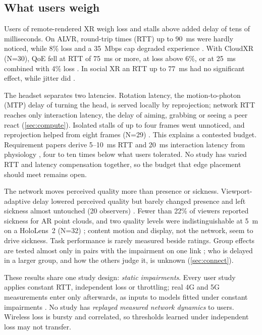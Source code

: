 \subsection{What users weigh}
Users of remote-rendered XR weigh loss and stalls above added delay of tens of milliseconds. On ALVR,
round-trip times (RTT) up to 90~ms were hardly noticed, while 8\% loss and a 35~Mbps cap degraded
experience \cite{W3095344018}. With CloudXR (N=30), QoE fell at RTT of 75~ms or more, at loss above 6\%,
or at 25~ms combined with 4\% loss \cite{W4402156718}. In social XR an RTT up to 77~ms had no significant
effect, while jitter did \cite{W4410087219}.

The headset separates two latencies. Rotation latency, the motion-to-photon (MTP) delay of turning the
head, is served locally by reprojection; network RTT reaches only interaction latency, the delay of
aiming, grabbing or seeing a peer react (\cref{sec:compute}). Isolated stalls of up to four frames went
unnoticed, and reprojection helped from eight frames (N=29) \cite{W4301184864}. This explains a contested
budget. Requirement papers derive 5--10~ms RTT and 20~ms interaction latency from physiology
\cite{W3035467795}, four to ten times below what users tolerated. No study has varied RTT and latency
compensation together, so the budget that edge placement should meet remains open.

The network moves perceived quality more than presence or sickness. Viewport-adaptive delay lowered
perceived quality but barely changed presence and left sickness almost untouched (20 observers)
\cite{W3037996690}. Fewer than 22\% of viewers reported sickness for AR point clouds, and two quality
levels were indistinguishable at 5~m on a HoloLens~2 (N=32) \cite{W4387831705}; content motion and
display, not the network, seem to drive sickness. Task performance is rarely measured beside
ratings. Group effects are tested almost only in pairs with
the impairment on one link \cite{W4415821547}; who is delayed in a larger group, and how the others judge
it, is unknown (\cref{sec:connect}).

These results share one study design: \emph{static impairments}. Every user study applies constant RTT,
independent loss or throttling; real 4G and 5G measurements enter only
afterwards, as inputs to models fitted under constant impairments \cite{W4405935991}. No study has
\emph{replayed measured network dynamics} to users. Wireless loss is bursty and correlated, so thresholds learned under independent loss may not transfer.

